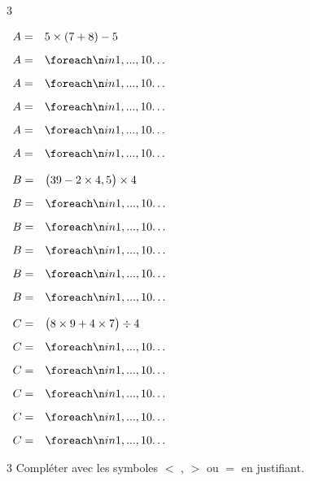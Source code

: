 \documentclass[a4paper]{book}
\begin{document}
{\begin{exerciceNote}{3}
        \begin{minipage}{0.3\linewidth}
            $\begin{array}{ll}
                A = & 5\times(7+8)-5 \\[2ex]
                A = & \points[10]\\[2ex]
                A = & \points[10]\\[2ex]
                A = & \points[10]\\[2ex]
                A = & \points[10]\\[2ex]
                A = & \points[10]
            \end{array}$
        \end{minipage}
        \vline
        \begin{minipage}{0.35\linewidth}
            $\begin{array}{ll}
                B = & \big(39-2\times4,5\big)\times4 \\[2ex]
                B = & \points[10]\\[2ex]
                B = & \points[10]\\[2ex]
                B = & \points[10]\\[2ex]
                B = & \points[10]\\[2ex]
                B = & \points[10]
            \end{array}$
        \end{minipage}
        \vline
        \begin{minipage}{0.3\linewidth}
            $\begin{array}{ll}
                C = & \big(8\times9+4\times7\big)\div4 \\[2ex]
                C = & \points[10]\\[2ex]
                C = & \points[10]\\[2ex]
                C = & \points[10]\\[2ex]
                C = & \points[10]\\[2ex]
                C = & \points[10]
            \end{array}$
        \end{minipage}
    \end{exerciceNote}


    \begin{exerciceNote}{3}
        Compléter avec les symboles $<$ , $>$ ou $=$ en justifiant.

        \medskip
        

\end{exerciceNote}}
\end{document}
